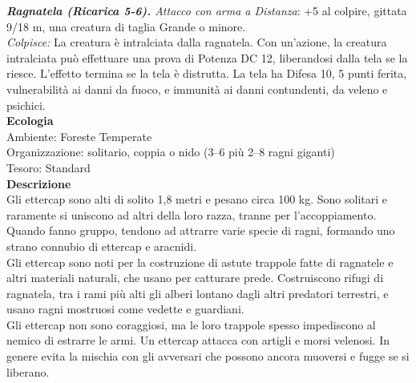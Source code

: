 \begin{multicols}{2}
\emph{\textbf{Ragnatela (Ricarica 5-6).} Attacco con arma a Distanza}: +5 al colpire, gittata 9/18 m, una creatura di taglia Grande o minore.\\
\emph{Colpisce:} La creatura è intralciata dalla ragnatela. Con un'azione, la creatura intralciata può effettuare una prova di Potenza DC  12, liberandosi dalla tela se la riesce. L'effetto termina se la tela è distrutta. La tela ha Difesa 10, 5 punti ferita, vulnerabilità ai danni da fuoco, e immunità ai danni contundenti, da veleno e psichici.\\
\textbf{Ecologia}\\
Ambiente: Foreste Temperate\\
Organizzazione: solitario, coppia o nido (3–6 più 2–8 ragni giganti)\\
Tesoro: Standard\\
\textbf{Descrizione}\\
Gli ettercap sono alti di solito 1,8 metri e pesano circa 100 kg. Sono solitari e raramente si uniscono ad altri della loro razza, tranne per l’accoppiamento. Quando fanno gruppo, tendono ad attrarre varie specie di ragni, formando uno strano connubio di ettercap e aracnidi.\\
Gli ettercap sono noti per la costruzione di astute trappole fatte di ragnatele e altri materiali naturali, che usano per catturare prede. Costruiscono rifugi di ragnatela, tra i rami più alti gli alberi lontano dagli altri predatori terrestri, e usano ragni mostruosi come vedette e guardiani.\\
Gli ettercap non sono coraggiosi, ma le loro trappole spesso impediscono al nemico di estrarre le armi. Un ettercap attacca con artigli e morsi velenosi. In genere evita la mischia con gli avversari che possono ancora muoversi e fugge se si liberano.\\


\end{multicols}
